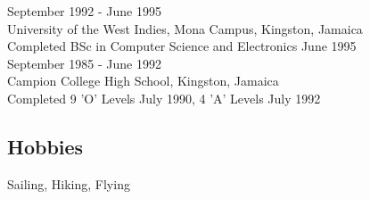 \documentclass{article}[10]
\begin{document}
\noindent September 1992 - June 1995\\
University of the West Indies, Mona Campus, Kingston, Jamaica\\
Completed BSc in Computer Science and Electronics June 1995\\

\noindent September 1985 - June 1992\\
Campion College High School, Kingston, Jamaica\\
Completed 9 'O' Levels July 1990, 4 'A' Levels July 1992

\subsection*{Hobbies}
Sailing, Hiking, Flying
\end{document}
